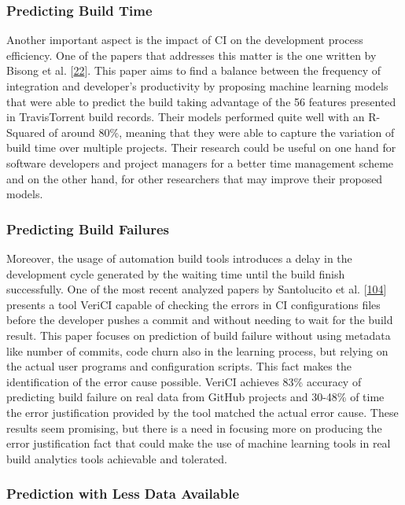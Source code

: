 \documentclass[]{book}
\begin{document}
\subsubsection{Predicting Build Time}\label{predicting-build-time}

Another important aspect is the impact of CI on the development process
efficiency. One of the papers that addresses this matter is the one
written by Bisong et al.
{[}\protect\hyperlink{ref-bisong2017built}{22}{]}. This paper aims to
find a balance between the frequency of integration and developer's
productivity by proposing machine learning models that were able to
predict the build taking advantage of the 56 features presented in
TravisTorrent build records. Their models performed quite well with an
R-Squared of around 80\%, meaning that they were able to capture the
variation of build time over multiple projects. Their research could be
useful on one hand for software developers and project managers for a
better time management scheme and on the other hand, for other
researchers that may improve their proposed models.

\subsubsection{Predicting Build
Failures}\label{predicting-build-failures}

Moreover, the usage of automation build tools introduces a delay in the
development cycle generated by the waiting time until the build finish
successfully. One of the most recent analyzed papers by Santolucito et
al. {[}\protect\hyperlink{ref-santolucito2018statically}{104}{]}
presents a tool VeriCI capable of checking the errors in CI
configurations files before the developer pushes a commit and without
needing to wait for the build result. This paper focuses on prediction
of build failure without using metadata like number of commits, code
churn also in the learning process, but relying on the actual user
programs and configuration scripts. This fact makes the identification
of the error cause possible. VeriCI achieves 83\% accuracy of predicting
build failure on real data from GitHub projects and 30-48\% of time the
error justification provided by the tool matched the actual error cause.
These results seem promising, but there is a need in focusing more on
producing the error justification fact that could make the use of
machine learning tools in real build analytics tools achievable and
tolerated.

\subsubsection{Prediction with Less Data
Available}\label{prediction-with-less-data-available}
\end{document}
